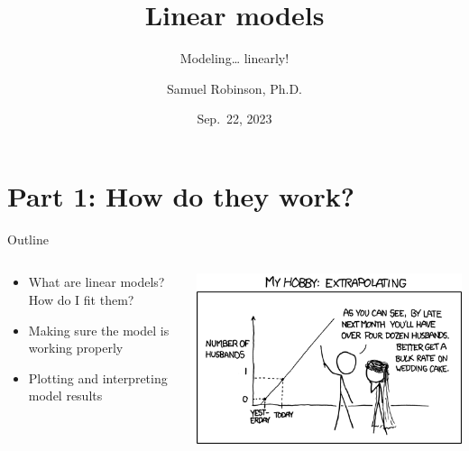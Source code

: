 \documentclass[
  ignorenonframetext,
  aspectratio=169]{beamer}
\title{Linear models}
\subtitle{Modeling\ldots{} linearly!}
\author{Samuel Robinson, Ph.D.}
\date{Sep.~22, 2023}
\begin{document}
\frame{\titlepage}

\hypertarget{part-1-how-do-they-work}{%
\section{Part 1: How do they work?}\label{part-1-how-do-they-work}}

\begin{frame}{Outline}
\protect\hypertarget{outline}{}
\begin{columns}[T]
\begin{column}{0.48\textwidth}
\begin{itemize}[<+->]
\item
  What are linear models? How do I fit them?
\item
  Making sure the model is working properly
\item
  Plotting and interpreting model results
\end{itemize}
\end{column}

\begin{column}{0.48\textwidth}
\includegraphics[width=1\textwidth,height=\textheight]{xkcd_extrapolating.png}
\end{column}
\end{columns}
\end{frame}
\end{document}
